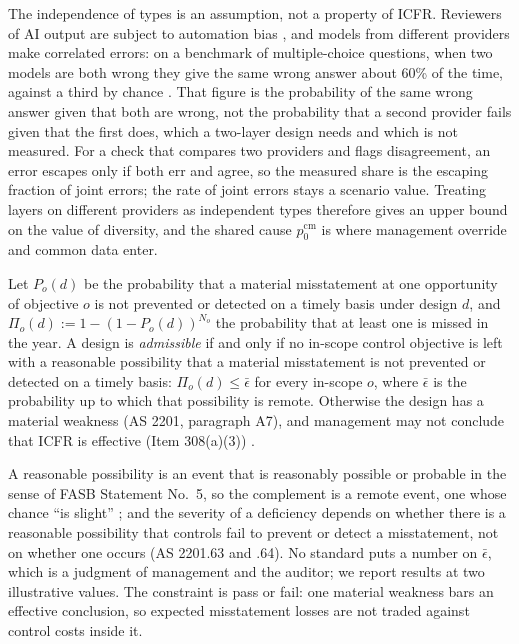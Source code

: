 The independence of types is an assumption, not a property of ICFR. Reviewers of AI output are subject to automation bias \citep{parasuraman2010complacency}, and models from different providers make correlated errors: on a benchmark of multiple-choice questions, when two models are both wrong they give the same wrong answer about 60\% of the time, against a third by chance \citep{kim2025correlated}. That figure is the probability of the same wrong answer given that both are wrong, not the probability that a second provider fails given that the first does, which a two-layer design needs and which is not measured. For a check that compares two providers and flags disagreement, an error escapes only if both err and agree, so the measured share is the escaping fraction of joint errors; the rate of joint errors stays a scenario value. Treating layers on different providers as independent types therefore gives an upper bound on the value of diversity, and the shared cause $p^{\mathrm{cm}}_0$ is where management override and common data enter.

\begin{definition}\label{def:acct-admissible}
Let $P_o(d)$ be the probability that a material misstatement at one opportunity of objective $o$ is not prevented or detected on a timely basis under design $d$, and $\Pi_o(d):=1-(1-P_o(d))^{N_o}$ the probability that at least one is missed in the year. A design is \emph{admissible} if and only if no in-scope control objective is left with a reasonable possibility that a material misstatement is not prevented or detected on a timely basis: $\Pi_o(d)\le\bar\epsilon$ for every in-scope $o$, where $\bar\epsilon$ is the probability up to which that possibility is remote. Otherwise the design has a material weakness (AS 2201, paragraph A7), and management may not conclude that ICFR is effective (Item 308(a)(3)) \citep{pcaob2026as2201,cfr2026sec229308}.
\end{definition}

A reasonable possibility is an event that is reasonably possible or probable in the sense of FASB Statement No.~5, so the complement is a remote event, one whose chance ``is slight'' \citep{fasb1975fas5}; and the severity of a deficiency depends on whether there is a reasonable possibility that controls fail to prevent or detect a misstatement, not on whether one occurs (AS 2201.63 and .64). No standard puts a number on $\bar\epsilon$, which is a judgment of management and the auditor; we report results at two illustrative values. The constraint is pass or fail: one material weakness bars an effective conclusion, so expected misstatement losses are not traded against control costs inside it.

